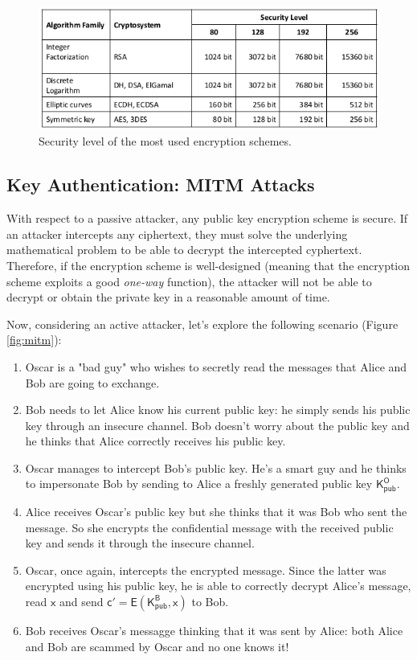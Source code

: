\documentclass{article}
\begin{document}
\begin{figure}
    \centering
    \includegraphics[width=0.75\linewidth]{figures/security_level.png}
    \caption{\label{fig:security_level}Security level of the most used encryption schemes.}
\end{figure}


\subsection{Key Authentication: MITM Attacks}

\par \noindent With respect to a passive attacker, any public key encryption scheme is secure. If an attacker intercepts any ciphertext, they must solve the underlying mathematical problem to be able to decrypt the intercepted cyphertext. Therefore, if the encryption scheme is well-designed (meaning that the encryption scheme exploits a good \textit{one-way} function), the attacker will not be able to decrypt or obtain the private key in a reasonable amount of time.

\par \noindent Now, considering an active attacker, let's explore the following scenario (Figure \ref{fig:mitm}):

\begin{enumerate}
    \item Oscar is a "bad guy" who wishes to secretly read the messages that Alice and Bob are going to exchange.
    \item Bob needs to let Alice know his current public key: he simply sends his public key through an insecure channel. Bob doesn't worry about the public key and he thinks that Alice correctly receives  his public key.
    \item Oscar manages to intercept Bob's public key. He's a smart guy and he thinks to impersonate Bob by sending to Alice a freshly generated public key $\mathsf{K_{pub}^{O}}$.
    \item Alice receives Oscar's public key but she thinks that it was Bob who sent the message. So she encrypts the confidential message with the received public key and sends it through the insecure channel.
    \item Oscar, once again, intercepts the encrypted message. Since the latter was encrypted using his public key, he is able to correctly decrypt Alice's message, read $\mathsf{x}$ and send $\mathsf{c' = E(K_{pub}^{B}, x)}$ to Bob.
    \item Bob receives Oscar's messagge thinking that it was sent by Alice: both Alice and Bob are scammed by Oscar and no one knows it!
\end{enumerate}
\end{document}

